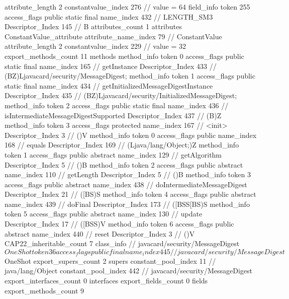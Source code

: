 {{{{{{{					attribute_length	2
					constantvalue_index	276		// value = 64
				}
				}
			}
			field_info {
				token	255
				access_flags	public static final
				name_index	432		// LENGTH_SM3
				Descriptor_Index	145		// B
				attributes_count	1
				attributes {
				ConstantValue_attribute {
					attribute_name_index	79		// ConstantValue
					attribute_length	2
					constantvalue_index	229		// value = 32
				}
				}
			}
			}
			export_methods_count	11
			methods {
				method_info {
					token	0
					access_flags	public static final
					name_index	165		// getInstance
					Descriptor_Index	433		// (BZ)Ljavacard/security/MessageDigest;
				}
				method_info {
					token	1
					access_flags	public static final
					name_index	434		// getInitializedMessageDigestInstance
					Descriptor_Index	435		// (BZ)Ljavacard/security/InitializedMessageDigest;
				}
				method_info {
					token	2
					access_flags	public static final
					name_index	436		// isIntermediateMessageDigestSupported
					Descriptor_Index	437		// (B)Z
				}
				method_info {
					token	3
					access_flags	protected
					name_index	167		// <init>
					Descriptor_Index	3		// ()V
				}
				method_info {
					token	0
					access_flags	public
					name_index	168		// equals
					Descriptor_Index	169		// (Ljava/lang/Object;)Z
				}
				method_info {
					token	1
					access_flags	public abstract
					name_index	129		// getAlgorithm
					Descriptor_Index	5		// ()B
				}
				method_info {
					token	2
					access_flags	public abstract
					name_index	110		// getLength
					Descriptor_Index	5		// ()B
				}
				method_info {
					token	3
					access_flags	public abstract
					name_index	438		// doIntermediateMessageDigest
					Descriptor_Index	21		// ([BS)S
				}
				method_info {
					token	4
					access_flags	public abstract
					name_index	439		// doFinal
					Descriptor_Index	173		// ([BSS[BS)S
				}
				method_info {
					token	5
					access_flags	public abstract
					name_index	130		// update
					Descriptor_Index	17		// ([BSS)V
				}
				method_info {
					token	6
					access_flags	public abstract
					name_index	440		// reset
					Descriptor_Index	3		// ()V
				}
			}
			CAP22_inheritable_count	7
		}
		class_info {		// javacard/security/MessageDigest$OneShot
			token	36
			access_flags	public final
			name_index	445		// javacard/security/MessageDigest$OneShot
			export_supers_count	2
			supers {
				constant_pool_index	11		// java/lang/Object
				constant_pool_index	442		// javacard/security/MessageDigest
			}
			export_interfaces_count	0
			interfaces {
			}
			export_fields_count	0
			fields {
			}
			export_methods_count	9
}}}
